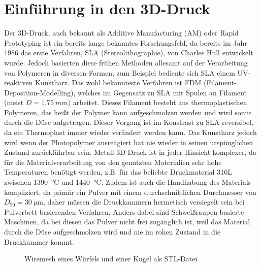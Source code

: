 \documentclass[main.tex]{subfiles}
\begin{document}
\section{Einführung in den 3D-Druck}
Der 3D-Druck, auch bekannt als Additive Manufacturing (AM) oder Rapid Prototyping ist ein bereits lange bekanntes Forschungsfeld, da bereits im Jahr 1986 das erste Verfahren, SLA (Stereolithographie), von Charles Hull entwickelt wurde. Jedoch basierten diese frühen Methoden allesamt auf der Verarbeitung von Polymeren in diversen Formen, zum Beispiel bediente sich SLA einem UV-reaktiven Kunstharz. Das wohl bekannteste Verfahren ist FDM (Filament-Deposition-Modelling), welches im Gegensatz zu SLA mit Spulen an Filament (meist $D=\qty{1.75}{mm}$) arbeitet. Dieses Filament besteht aus thermoplastischen Polymeren, das heißt der Polymer kann aufgeschmolzen werden und wird somit durch die Düse aufgetragen. Dieser Vorgang ist im Konstrast zu SLA reversibel, da ein Thermoplast immer wieder verändert werden kann.\parencite{BHATIA20231060} Das Kunstharz jedoch wird wenn der Photopolymer ausreagiert hat nie wieder in seinen urspünglichen Zustand zurückführbar sein.\parencite{FACUNDO_1}
Metall-3D-Druck ist in jeder Hinsicht komplexer, da für die Materialverarbeitung von den genutzten Materialien sehr hohe Temperaturen benötigt werden, z.B. für das beliebte Druckmaterial 316L zwischen  \qty{1390}{\celsius} und \qty{1440}{\degreeCelsius}\parencite{610LSTEEL}. Zudem ist auch die Handhabung des Materials kompliziert, da primär ein Pulver mit einem durchschnittlichen Durchmesser von $D_{50}=\SI{30}{\micro\meter}$\parencite[~S.3]{ZAKRZEWSKI2020115}, daher müssen die Druckkammern hermetisch versiegelt sein bei Pulverbett-basierenden Verfahren.
Anders dabei sind Schweißraupen-basierte Maschinen, da bei diesen das Pulver nicht frei zugänglich ist, weil das Material durch die Düse aufgeschmolzen wird und nie im rohen Zustand in die Druckkammer kommt.

\begin{figure}[h!]
\begin{center}
	\caption{Wiremesh eines Würfels und einer Kugel als STL-Datei}
	\label{img:stl_1}
\end{center}
\end{figure}	
\end{document}
